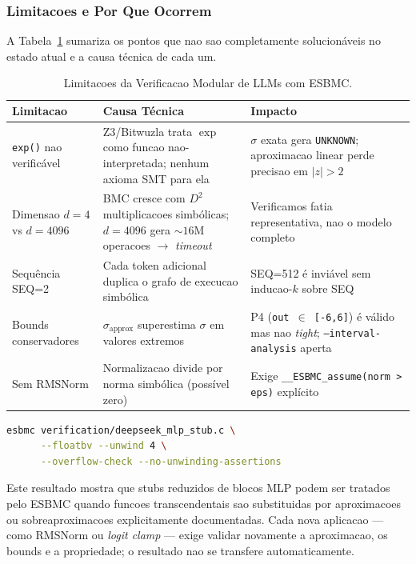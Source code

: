 \subsubsection{Limitacoes e Por Que Ocorrem}

A Tabela~\ref{tab:niveis_limitacoes} sumariza os pontos que nao sao completamente solucion\'{a}veis no estado atual e a causa t\'{e}cnica de cada um.

\begin{table}[htb]
\caption{Limitacoes da Verificacao Modular de LLMs com ESBMC.}
\label{tab:niveis_limitacoes}
\begin{center}
\begin{tabular}{p{2.8cm}|p{4.2cm}|p{4.5cm}}
\hline
\textbf{Limitacao} & \textbf{Causa T\'{e}cnica} & \textbf{Impacto} \\
\hline
\texttt{exp()} nao verific\'{a}vel & Z3/Bitwuzla trata $\exp$ como funcao nao-interpretada; nenhum axioma SMT para ela & $\sigma$ exata gera \texttt{UNKNOWN}; aproximacao linear perde precisao em $|z| > 2$ \\
\hline
Dimensao $d=4$ vs $d=4096$ & BMC cresce com $D^2$ multiplicacoes simb\'{o}licas; $d=4096$ gera ${\sim}16$M operacoes $\to$ \textit{timeout} & Verificamos fatia representativa, nao o modelo completo \\
\hline
Sequ\^{e}ncia SEQ=2 & Cada token adicional duplica o grafo de execucao simb\'{o}lica & SEQ=512 \'{e} invi\'{a}vel sem inducao-$k$ sobre SEQ \\
\hline
Bounds conservadores & $\sigma_{\text{approx}}$ superestima $\sigma$ em valores extremos & P4 (\texttt{out $\in$ [-6,6]}) \'{e} v\'{a}lido mas nao \textit{tight}; \texttt{--interval-analysis} aperta \\
\hline
Sem RMSNorm & Normalizacao divide por norma simb\'{o}lica (poss\'{i}vel zero) & Exige \texttt{\_\_ESBMC\_assume(norm > eps)} expl\'{i}cito \\
\hline
\end{tabular}
\end{center}
\end{table}


\begin{lstlisting}[language=bash, numbers=none]
esbmc verification/deepseek_mlp_stub.c \
      --floatbv --unwind 4 \
      --overflow-check --no-unwinding-assertions
\end{lstlisting}

Este resultado mostra que stubs reduzidos de blocos MLP podem ser tratados pelo
ESBMC quando funcoes transcendentais sao substituidas por aproximacoes ou
sobreaproximacoes explicitamente documentadas. Cada nova aplicacao --- como
RMSNorm ou \textit{logit clamp} --- exige validar novamente a aproximacao, os
bounds e a propriedade; o resultado nao se transfere automaticamente.




